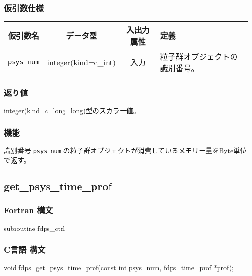 \subsubsection*{仮引数仕様}
\begin{table}[h]
\begin{tabularx}{\linewidth}{cccX}
\toprule
\rowcolor{Snow2}
仮引数名 & データ型 & 入出力属性 & 定義 \\
\midrule
\texttt{psys\_num} & integer(kind=c\_int) & 入力 & 粒子群オブジェクトの識別番号。\\
\bottomrule
\end{tabularx}
\end{table}

\subsubsection*{返り値}
integer(kind=c\_long\_long)型のスカラー値。

\subsubsection*{機能}
識別番号 \texttt{psys\_num} の粒子群オブジェクトが消費しているメモリー量をByte単位で返す。

\clearpage

\subsection{get\_psys\_time\_prof}
\subsubsection*{Fortran 構文}
\begin{screen}
\begin{spverbatim}
subroutine fdps_ctrl%
\end{spverbatim}
\end{screen}

\subsubsection*{C言語 構文}
\begin{screen}
\begin{spverbatim}
void fdps_get_psys_time_prof(const int psys_num,
                             fdps_time_prof *prof);
\end{spverbatim}
\end{screen}


